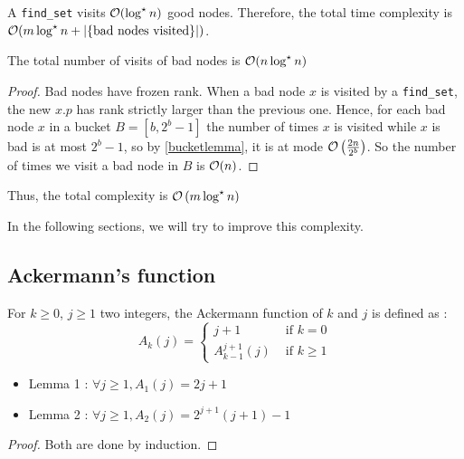 \documentclass{cours}
\begin{document}
A \texttt{find\_set} visits $\mathcal{O}(\log^{\star} n)$ good nodes. Therefore, the total time complexity is $\mathcal{O}(m\log^{\star} n + \left|\left\{\text{bad nodes visited}\right\}\right|)$.

\begin{proposition}
    The total number of visits of bad nodes is $\mathcal{O}(n\log^{\star} n)$
\end{proposition}
\begin{proof}
    Bad nodes have frozen rank. When a bad node $x$ is visited by a \texttt{find\_set}, the new $x.p$ has rank strictly larger than the previous one. Hence, for each bad node $x$ in a bucket $B = \left[b, 2^{b}-1\right]$ the number of times $x$ is visited while $x$ is bad is at most $2^{b} - 1$, so by \ref{bucketlemma}, it is at mode $\mathcal{O}\left(\frac{2n}{2^{b}}\right)$. So the number of times we visit a bad node in $B$ is $\mathcal{O}(n)$.
\end{proof}

Thus, the total complexity is $\mathcal{O}\left(m \log^{\star} n\right)$

In the following sections, we will try to improve this complexity.
\subsection{Ackermann's function}
\begin{definition}
    For $k \geq 0$, $j \geq 1$ two integers, the Ackermann function of $k$ and $j$ is defined as :
    \[
        A_{k}(j) = \begin{cases}
            j + 1                & \text{ if } k = 0    \\
            A_{k - 1}^{j + 1}(j) & \text{ if } k \geq 1
        \end{cases}
    \]
\end{definition}

\begin{proposition}[Properties]
    \begin{itemize}
        \item Lemma 1 : $\forall j \geq 1, A_{1}(j) = 2j + 1$
        \item Lemma 2 : $\forall j \geq 1, A_{2}(j) = 2^{j + 1}(j + 1) - 1$
    \end{itemize}
\end{proposition}
\begin{proof}
    Both are done by induction.
\end{proof}
\end{document}

